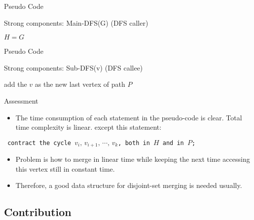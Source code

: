 \documentclass{beamer}
\begin{document}
\begin{frame}{Pseudo Code}
	\SetAlFnt{\normalsize}
	\begin{algorithm}[H]
		\caption{Strong components: Main-DFS(G) (DFS caller)}
		$H=G$\;
	\end{algorithm}
\end{frame}

\begin{frame}{Pseudo Code}
	\SetAlFnt{\normalsize}
	\begin{algorithm}[H]
		\caption{Strong components: Sub-DFS(v) (DFS callee)}
		add the $v$ as the new last vertex of path $P$\;
	\end{algorithm}
\end{frame}



\begin{frame}{Assessment}
	\begin{itemize}
		\item
		The time consumption of each statement in the pseudo-code is clear. Total time complexity is linear.
		except this statement:
	\end{itemize}
	\begin{center}
		\texttt{\small 
		contract the cycle $v_i,\, v_{i+1},\,\cdots,\,v_k$, both in $H$ and in $P$;
		}
	\end{center}	
	\begin{itemize}
		\item
		Problem is how to merge in linear time while keeping the next time accessing this vertex still in constant time.
		\item
		Therefore, a good data structure for disjoint-set merging is needed usually.
	\end{itemize}
\end{frame}


\subsection{Contribution}
\end{document}
